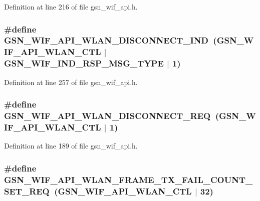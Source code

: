 Definition at line 216 of file gsn\_\-wif\_\-api.h.

\hypertarget{a00606_af905b59fa8d65ece02d1c3ad08f8e8e0}{
\subsubsection[{GSN\_\-WIF\_\-API\_\-WLAN\_\-DISCONNECT\_\-IND}]{\setlength{\rightskip}{0pt plus 5cm}\#define GSN\_\-WIF\_\-API\_\-WLAN\_\-DISCONNECT\_\-IND~(GSN\_\-WIF\_\-API\_\-WLAN\_\-CTL $|$ GSN\_\-WIF\_\-IND\_\-RSP\_\-MSG\_\-TYPE $|$ 1)}}
\label{a00606_af905b59fa8d65ece02d1c3ad08f8e8e0}


Definition at line 257 of file gsn\_\-wif\_\-api.h.

\hypertarget{a00606_a000d192d1af36858dbc749f275d21d9a}{
\subsubsection[{GSN\_\-WIF\_\-API\_\-WLAN\_\-DISCONNECT\_\-REQ}]{\setlength{\rightskip}{0pt plus 5cm}\#define GSN\_\-WIF\_\-API\_\-WLAN\_\-DISCONNECT\_\-REQ~(GSN\_\-WIF\_\-API\_\-WLAN\_\-CTL $|$ 1)}}
\label{a00606_a000d192d1af36858dbc749f275d21d9a}


Definition at line 189 of file gsn\_\-wif\_\-api.h.

\hypertarget{a00606_a2c95af70d6e37fddd526c78e69a75027}{
\subsubsection[{GSN\_\-WIF\_\-API\_\-WLAN\_\-FRAME\_\-TX\_\-FAIL\_\-COUNT\_\-SET\_\-REQ}]{\setlength{\rightskip}{0pt plus 5cm}\#define GSN\_\-WIF\_\-API\_\-WLAN\_\-FRAME\_\-TX\_\-FAIL\_\-COUNT\_\-SET\_\-REQ~(GSN\_\-WIF\_\-API\_\-WLAN\_\-CTL $|$ 32)}}
\label{a00606_a2c95af70d6e37fddd526c78e69a75027}


